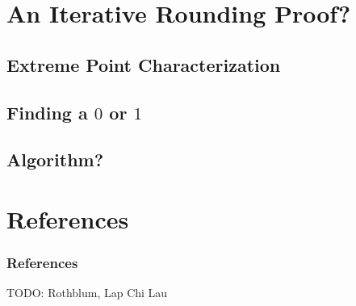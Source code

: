 \documentclass{beamer}
\begin{document}
\section{An Iterative Rounding Proof?}
\subsection{Extreme Point Characterization}
\subsection{Finding a $0$ or $1$}
\subsection{Algorithm?}
\section{References}
\begin{frame}
\frametitle{References}
TODO: Rothblum, Lap Chi Lau
\end{frame}
\end{document}
